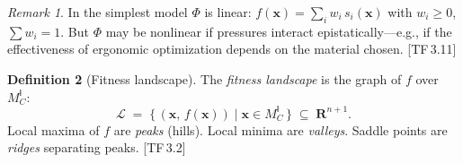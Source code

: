 \documentclass[11pt, a4paper]{article}
\theoremstyle{definition}
\newtheorem{definition}{Definition}[section]
\theoremstyle{plain}
\theoremstyle{remark}
\newtheorem{remark}[definition]{Remark}
\newcommand{\MC}{M^{\mathsf{I}}_C}          %
\providecommand{\R}{}
\renewcommand{\R}{\mathbf{R}}               %
\newcommand{\FitLand}{\mathcal{L}}           %
\newcommand{\TF}[1]{\textnormal{[TF\,#1]}}  %
\begin{document}
\begin{remark}
In the simplest model $\Phi$ is linear:
$f(\bm{x}) = \sum_i w_i \, s_i(\bm{x})$ with $w_i \geq 0$,
$\sum w_i = 1$. But $\Phi$ may be nonlinear if pressures interact
epistatically---e.g., if the effectiveness of ergonomic optimization
depends on the material chosen. \TF{3.11}
\end{remark}

\begin{definition}[Fitness landscape]\label{def:3.2}
The \emph{fitness landscape} is the graph of $f$ over $\MC$:
\[
  \FitLand \;=\; \bigl\{\, (\bm{x},\, f(\bm{x}))
    \;\big|\; \bm{x} \in \MC \,\bigr\}
  \;\subseteq\; \R^{n+1}.
\]
Local maxima of $f$ are \emph{peaks} (hills). Local minima are
\emph{valleys}. Saddle points are \emph{ridges} separating peaks. \TF{3.2}
\end{definition}
\end{document}
